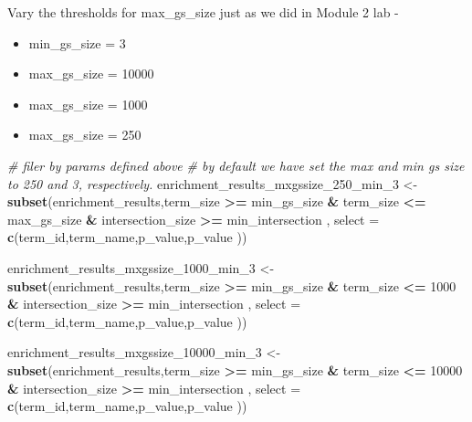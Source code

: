 \documentclass[
]{book}
\newenvironment{Shaded}{\begin{snugshade}}{\end{snugshade}}
\newcommand{\AttributeTok}[1]{\textcolor[rgb]{0.13,0.29,0.53}{#1}}
\newcommand{\CommentTok}[1]{\textcolor[rgb]{0.56,0.35,0.01}{\textit{#1}}}
\newcommand{\DecValTok}[1]{\textcolor[rgb]{0.00,0.00,0.81}{#1}}
\newcommand{\FunctionTok}[1]{\textcolor[rgb]{0.13,0.29,0.53}{\textbf{#1}}}
\newcommand{\NormalTok}[1]{#1}
\newcommand{\OtherTok}[1]{\textcolor[rgb]{0.56,0.35,0.01}{#1}}
\newcommand{\SpecialCharTok}[1]{\textcolor[rgb]{0.81,0.36,0.00}{\textbf{#1}}}
\begin{document}
Vary the thresholds for max\_gs\_size just as we did in Module 2 lab -

\begin{itemize}
\item
  min\_gs\_size = 3
\item
  max\_gs\_size = 10000
\item
  max\_gs\_size = 1000
\item
  max\_gs\_size = 250
\end{itemize}

\begin{Shaded}
\begin{Highlighting}[]
\CommentTok{\# filer by params defined above}
\CommentTok{\# by default we have set the max and min gs size to 250 and 3, respectively.}
\NormalTok{enrichment\_results\_mxgssize\_250\_min\_3 }\OtherTok{\textless{}{-}} 
                        \FunctionTok{subset}\NormalTok{(enrichment\_results,term\_size }\SpecialCharTok{\textgreater{}=}\NormalTok{ min\_gs\_size }\SpecialCharTok{\&} 
\NormalTok{                                   term\_size }\SpecialCharTok{\textless{}=}\NormalTok{ max\_gs\_size }\SpecialCharTok{\&} 
\NormalTok{                                   intersection\_size }\SpecialCharTok{\textgreater{}=}\NormalTok{ min\_intersection , }
                                 \AttributeTok{select =} \FunctionTok{c}\NormalTok{(term\_id,term\_name,p\_value,p\_value ))}

\NormalTok{enrichment\_results\_mxgssize\_1000\_min\_3 }\OtherTok{\textless{}{-}} 
                        \FunctionTok{subset}\NormalTok{(enrichment\_results,term\_size }\SpecialCharTok{\textgreater{}=}\NormalTok{ min\_gs\_size }\SpecialCharTok{\&} 
\NormalTok{                                   term\_size }\SpecialCharTok{\textless{}=} \DecValTok{1000} \SpecialCharTok{\&} 
\NormalTok{                                   intersection\_size }\SpecialCharTok{\textgreater{}=}\NormalTok{ min\_intersection , }
                                 \AttributeTok{select =} \FunctionTok{c}\NormalTok{(term\_id,term\_name,p\_value,p\_value ))}

\NormalTok{enrichment\_results\_mxgssize\_10000\_min\_3 }\OtherTok{\textless{}{-}} 
                        \FunctionTok{subset}\NormalTok{(enrichment\_results,term\_size }\SpecialCharTok{\textgreater{}=}\NormalTok{ min\_gs\_size }\SpecialCharTok{\&} 
\NormalTok{                                   term\_size }\SpecialCharTok{\textless{}=} \DecValTok{10000} \SpecialCharTok{\&} 
\NormalTok{                                   intersection\_size }\SpecialCharTok{\textgreater{}=}\NormalTok{ min\_intersection , }
                                 \AttributeTok{select =} \FunctionTok{c}\NormalTok{(term\_id,term\_name,p\_value,p\_value ))}
\end{Highlighting}
\end{Shaded}
\end{document}
